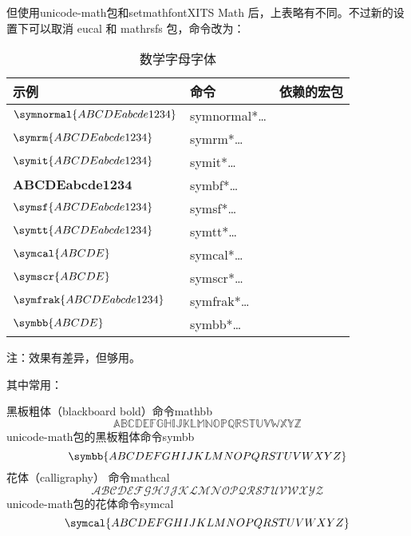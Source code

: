 \documentclass{article}
\begin{document}
但使用unicode-math包和setmathfont{XITS Math} 后，上表略有不同。不过新的设置下可以取消 eucal 和 mathrsfs 包，命令改为：
\begin{table}[htp]
  \centering
  \caption{数学字母字体} \label{tbl:math-fonts}
  \begin{tabular}{*{3}{l}}
  \hline
  \textbf{示例}    & \textbf{命令} & \textbf{依赖的宏包}\\
  \hline
  $\symnormal{ABCDE abcde 1234}$  & {symnormal}*{\ldots}&       \\
  $\symrm{ABCDE abcde 1234}$      & {symrm}*{\ldots}    &       \\
  $\symit{ABCDE abcde 1234}$      & {symit}*{\ldots}    &       \\
  $\symbf{ABCDE abcde 1234}$      & {symbf}*{\ldots}    &       \\
  $\symsf{ABCDE abcde 1234}$      & {symsf}*{\ldots}    &       \\
  $\symtt{ABCDE abcde 1234}$      & {symtt}*{\ldots}    &       \\
  $\symcal{ABCDE}$                  & {symcal}*{\ldots}   &   \\
  \hline
  $\symscr{ABCDE}$                & {symscr}*{\ldots}   & \\
  $\symfrak{ABCDE abcde 1234}$    & {symfrak}*{\ldots}  &   \\
  $\symbb{ABCDE}$                 & {symbb}*{\ldots}    &    \\
  \hline
  \end{tabular}
\end{table}
注：效果有差异，但够用。


其中常用：

黑板粗体（blackboard bold）命令mathbb
\begin{equation}
  \mathbb{ABCDEFGHIJKLMNOPQRSTUVWXYZ}
\end{equation}
unicode-math包的黑板粗体命令symbb
\begin{equation}
  \symbb{ABCDEFGHIJKLMNOPQRSTUVWXYZ}
\end{equation}
花体（calligraphy） 命令mathcal
\begin{equation}
  \mathcal{ABCDEFGHIJKLMNOPQRSTUVWXYZ}
\end{equation}
unicode-math包的花体命令symcal
\begin{equation}
  \symcal{ABCDEFGHIJKLMNOPQRSTUVWXYZ}
\end{equation}
\end{document}
